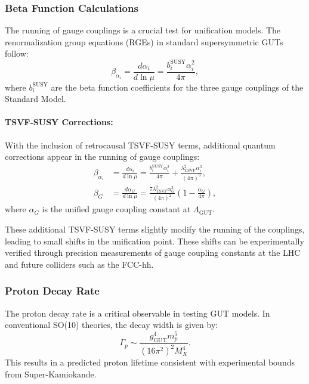 \documentclass[twocolumn,superscriptaddress,floatfix]{revtex4-2}
\begin{document}
\subsubsection{Beta Function Calculations}
\label{subsec:calculations}

The running of gauge couplings is a crucial test for unification models. The renormalization group equations (RGEs) in standard supersymmetric GUTs follow:
\begin{equation}
\beta_{\alpha_i} = \frac{d\alpha_i}{d\ln\mu} = \frac{b_i^{\text{SUSY}}\alpha_i^2}{4\pi}, \label{eq:beta_susy}
\end{equation}
where $b_i^{\text{SUSY}}$ are the beta function coefficients for the three gauge couplings of the Standard Model.

\paragraph{TSVF-SUSY Corrections:} 
With the inclusion of retrocausal TSVF-SUSY terms, additional quantum corrections appear in the running of gauge couplings:
\begin{align}
\beta_{\alpha_i} &= \frac{d\alpha_i}{d\ln\mu} = \frac{b_i^{\text{SUSY}}\alpha_i^2}{4\pi} + \frac{\lambda_{\text{TSVF}}^2\alpha_i^3}{(4\pi)^3}, \label{eq:beta_alpha} \\
\beta_G &= \frac{d\alpha_G}{d\ln\mu} = \frac{7\lambda_{\text{TSVF}}^2\alpha_G^2}{(4\pi)^2}\left(1 - \frac{\alpha_G}{4\pi}\right), \label{eq:beta_G}
\end{align}
where $\alpha_G$ is the unified gauge coupling constant at $\Lambda_{\text{GUT}}$.

These additional TSVF-SUSY terms slightly modify the running of the couplings, leading to small shifts in the unification point. These shifts can be experimentally verified through precision measurements of gauge coupling constants at the LHC and future colliders such as the FCC-hh.

\subsubsection{Proton Decay Rate}
\label{subsec:proton_decay_rate}

The proton decay rate is a critical observable in testing GUT models. In conventional SO(10) theories, the decay width is given by:
\begin{equation}
\Gamma_p \sim \frac{g_{\text{GUT}}^4 m_p^5}{(16\pi^2)^2 M_X^4}. \label{eq:gamma_p}
\end{equation}
This results in a predicted proton lifetime consistent with experimental bounds from Super-Kamiokande.
\end{document}
